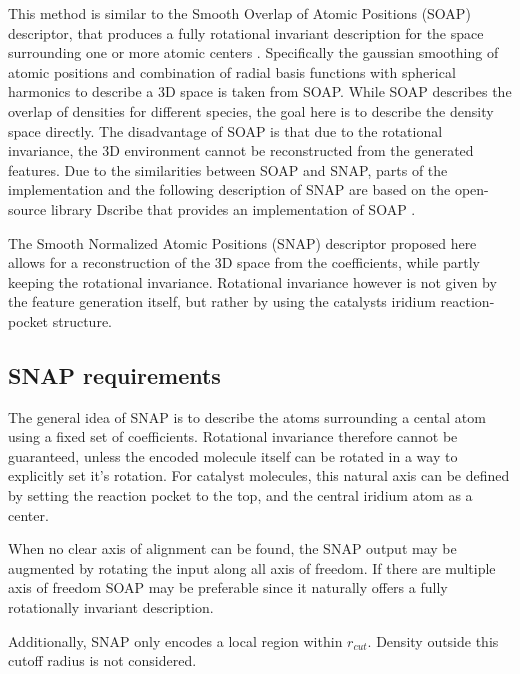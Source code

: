 This method is similar to the Smooth Overlap of Atomic Positions (SOAP) descriptor, that produces a 
fully rotational invariant description for the space surrounding one or more atomic centers \cite{Bart_k_2013}.
Specifically the gaussian smoothing of atomic positions and combination of radial basis functions with
spherical harmonics to describe a 3D space is taken from SOAP.
While SOAP describes the overlap of densities for different species, the goal here is to describe the density space directly.
The disadvantage of SOAP is that due to the rotational invariance, the 3D environment cannot be reconstructed from the generated features.
Due to the similarities between SOAP and SNAP, parts of the implementation and the following description of SNAP are based 
on the open-source library Dscribe that provides an implementation of SOAP \cite{dscribe}.

The Smooth Normalized Atomic Positions (SNAP) descriptor proposed here allows for a reconstruction of the 3D space from the coefficients, 
while partly keeping the rotational invariance.
Rotational invariance however is not given by the feature generation itself, but rather by using the catalysts iridium reaction-pocket structure.

\subsection{SNAP requirements}

The general idea of SNAP is to describe the atoms surrounding a cental atom using a fixed set of coefficients.
Rotational invariance therefore cannot be guaranteed, unless the encoded molecule itself can be rotated in a way to explicitly set it's rotation.
For catalyst molecules, this natural axis can be defined by setting the reaction pocket to the top, and the central iridium atom as a center.


When no clear axis of alignment can be found, the SNAP output may be augmented by rotating the input along all axis of freedom.
If there are multiple axis of freedom SOAP may be preferable since it naturally offers a fully rotationally invariant description.

Additionally, SNAP only encodes a local region within $r_{cut}$.
Density outside this cutoff radius is not considered.

